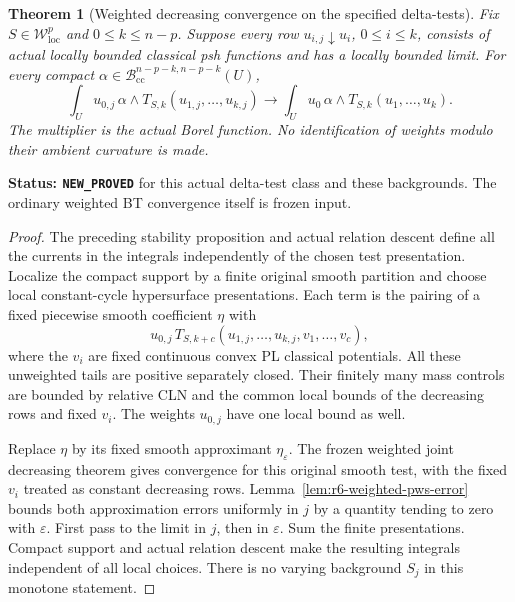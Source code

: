 \documentclass[11pt,a4paper]{article}
\numberwithin{equation}{section}
\newtheorem{theorem}{Theorem}[section]
\theoremstyle{definition}
\theoremstyle{remark}
\begin{document}
\begin{theorem}[Weighted decreasing convergence on the specified delta-tests]
\label{thm:r6-weighted-monotone-delta-tests}
Fix $S\in\mathcal W^p_{\mathrm{loc}}$ and
$0\leq k\leq n-p$. Suppose every row
$u_{i,j}\downarrow u_i$, $0\leq i\leq k$, consists of
actual locally bounded classical psh functions and has
a locally bounded limit. For every compact
$\alpha\in\mathscr B_{\mathrm{cc}}^{n-p-k,n-p-k}(U)$,
\[
 \int_U u_{0,j}\,\alpha\wedge
             T_{S,k}(u_{1,j},\ldots,u_{k,j})
       \longrightarrow
 \int_U u_0\,\alpha\wedge T_{S,k}(u_1,\ldots,u_k).
\]
The multiplier is the actual Borel function. No
identification of weights modulo their ambient curvature
is made.
\end{theorem}

\noindent\textbf{Status: \texttt{NEW\_PROVED}} for this
actual delta-test class and these backgrounds. The
ordinary weighted BT convergence itself is frozen input.

\begin{proof}
The preceding stability proposition and actual relation
descent define all the currents in the integrals
independently of the chosen test presentation. Localize
the compact support by a finite original smooth
partition and choose local constant-cycle hypersurface
presentations. Each term is the pairing of a fixed
piecewise smooth coefficient $\eta$ with
\[
 u_{0,j}\,T_{S,k+c}
       (u_{1,j},\ldots,u_{k,j},v_1,\ldots,v_c),
\]
where the $v_i$ are fixed continuous convex PL classical
potentials. All these unweighted tails are positive
separately closed. Their finitely many mass controls
are bounded by relative CLN and the common local bounds
of the decreasing rows and fixed $v_i$.
The weights $u_{0,j}$ have one local bound as well.

Replace $\eta$ by its fixed smooth approximant
$\eta_\varepsilon$. The frozen weighted joint decreasing
theorem gives convergence for this original smooth test,
with the fixed $v_i$ treated as constant decreasing rows.
Lemma~\ref{lem:r6-weighted-pws-error} bounds both
approximation errors uniformly in $j$ by a quantity
tending to zero with $\varepsilon$. First pass to the
limit in $j$, then in $\varepsilon$. Sum the finite
presentations. Compact support and actual relation
descent make the resulting integrals independent of
all local choices. There is no varying background $S_j$
in this monotone statement.
\end{proof}

\end{document}
